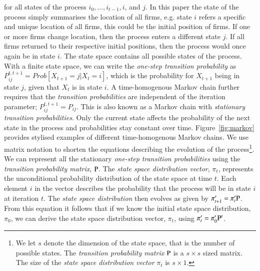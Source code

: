\documentclass[preprint, 12pt]{elsarticle}
\begin{document}
for all states of the process $i_0, \dots, i_{t-1}, i$, and $j$. In this paper the state of the process simply summarises the location of all firms, e.g. state $i$ refers a specific and unique location of all firms, this could be the initial position of firms. If one or more firms change location, then the process enters a different state $j$. If all firms returned to their respective initial positions, then the process would once again be in state $i$. The state space contains all possible states of the process. With a finite state space, we can write the \emph{one-step transition probability} as $P_{ij}^{t,t+1} = Prob\left[ {X_{t+1} = j} \left| {X_t = i} \right. \right]$, which is the probability for $X_{t+1}$ being in state $j$, given that $X_t$ is in state $i$. A time-homogenous Markov chain further requires that the \emph{transition probabilities} are independent of the iteration parameter; $P_{ij}^{t,t+1} = P_{ij}$. This is also known as a Markov chain with \emph{stationary transition probabilities}. Only the current state affects the probability of the next state in the process and probabilities stay constant over time. Figure~\ref{fig:markov} provides stylised examples of different time-homogenous Markov chains. We use matrix notation to shorten the equations describing the evolution of the process\footnote{We let $s$ denote the dimension of the state space, that is the number of possible states. The \emph{transition probability matrix} $\rm P$ is a $s \times s$ sized matrix. The size of the \emph{state space distribution vector} $\pi_t$ is $s \times 1$.}. We can represent all the stationary \emph{one-step transition probabilities} using the \emph{transition probability matrix}, $\rm P$. The \emph{state space distribution vector}, $\pi_t$, represents the unconditional probability distribution of the state space at time $t$. Each element $i$ in the vector describes the probability that the process will be in state $i$ at iteration $t$. The \emph{state space distribution} then evolves as given by $\pi'_{t+1} = \pi'_t \rm P$. From this equation it follows that if we know the initial state space distribution, $\pi_0$, we can derive the state space distribution vector, $\pi_t$, using $\pi'_t = \pi'_0 {\rm P}^t$.
\end{document}
